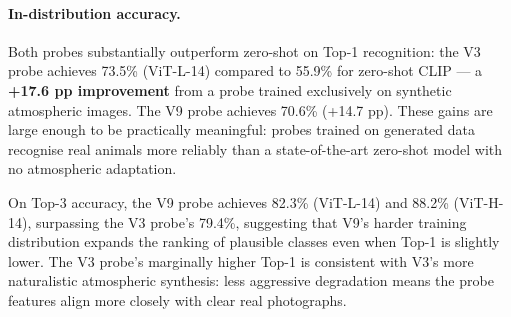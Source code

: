 \begin{table}[htbp]
\centering
\caption{Experiment~3: Zero-shot CLIP, V3 probe, and V9 probe evaluated on 57 real animal photographs. In-dist Top-1 measures recognition of known-class animals (N\,=\,34); OOD Max-Conf is the mean maximum predicted probability on animals never seen during training (N\,=\,23) --- lower indicates better calibration.}
\label{tab:exp3_real_photos}
\end{table}

\paragraph{In-distribution accuracy.}
Both probes substantially outperform zero-shot on Top-1 recognition: the V3 probe achieves 73.5\% (ViT-L-14) compared to 55.9\% for zero-shot CLIP — a \textbf{+17.6 pp improvement} from a probe trained exclusively on synthetic atmospheric images. The V9 probe achieves 70.6\% (+14.7 pp). These gains are large enough to be practically meaningful: probes trained on generated data recognise real animals more reliably than a state-of-the-art zero-shot model with no atmospheric adaptation.

\noindent On Top-3 accuracy, the V9 probe achieves 82.3\% (ViT-L-14) and 88.2\% (ViT-H-14), surpassing the V3 probe's 79.4\%, suggesting that V9's harder training distribution expands the ranking of plausible classes even when Top-1 is slightly lower. The V3 probe's marginally higher Top-1 is consistent with V3's more naturalistic atmospheric synthesis: less aggressive degradation means the probe features align more closely with clear real photographs.

